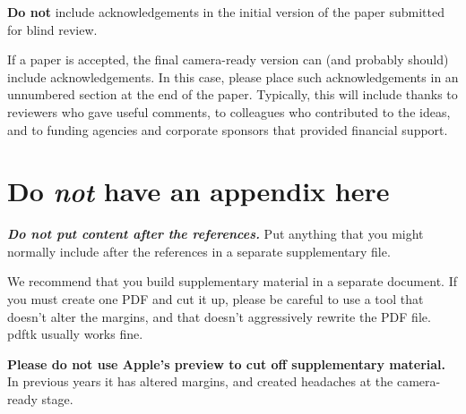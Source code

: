 \documentclass{article}
\begin{document}
\textbf{Do not} include acknowledgements in the initial version of
the paper submitted for blind review.

If a paper is accepted, the final camera-ready version can (and
probably should) include acknowledgements. In this case, please
place such acknowledgements in an unnumbered section at the
end of the paper. Typically, this will include thanks to reviewers
who gave useful comments, to colleagues who contributed to the ideas,
and to funding agencies and corporate sponsors that provided financial
support.


\nocite{langley00}





\appendix
\section{Do \emph{not} have an appendix here}

\textbf{\emph{Do not put content after the references.}}
%
Put anything that you might normally include after the references in a separate
supplementary file.

We recommend that you build supplementary material in a separate document.
If you must create one PDF and cut it up, please be careful to use a tool that
doesn't alter the margins, and that doesn't aggressively rewrite the PDF file.
pdftk usually works fine.

\textbf{Please do not use Apple's preview to cut off supplementary material.} In
previous years it has altered margins, and created headaches at the camera-ready
stage.
\end{document}
